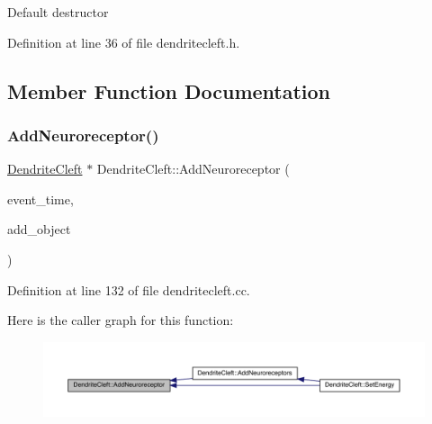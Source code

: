 Default destructor 

Definition at line 36 of file dendritecleft.\+h.



\subsection{Member Function Documentation}
\mbox{\label{class_dendrite_cleft_a65901c5659ca5eac161a26f15e0f437b}} 
\subsubsection{\texorpdfstring{Add\+Neuroreceptor()}{AddNeuroreceptor()}}
{\footnotesize\ttfamily \hyperlink{class_dendrite_cleft}{Dendrite\+Cleft} $\ast$ Dendrite\+Cleft\+::\+Add\+Neuroreceptor (\begin{DoxyParamCaption}\item[{std\+::chrono\+::time\+\_\+point$<$ \hyperlink{universe_8h_a0ef8d951d1ca5ab3cfaf7ab4c7a6fd80}{Clock} $>$}]{event\+\_\+time,  }\item[{\hyperlink{class_dendrite_cleft}{Dendrite\+Cleft} $\ast$}]{add\+\_\+object }\end{DoxyParamCaption})}



Definition at line 132 of file dendritecleft.\+cc.

Here is the caller graph for this function\+:\nopagebreak
\begin{figure}[H]
\begin{center}
\leavevmode
\includegraphics[width=350pt]{class_dendrite_cleft_a65901c5659ca5eac161a26f15e0f437b_icgraph}
\end{center}
\end{figure}
\mbox{\label{class_dendrite_cleft_a6d29f577ff12366f8f51804b13468395}} 
